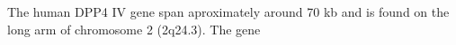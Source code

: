 The human DPP4 IV gene span aproximately around 70 kb and is found on the long arm of chromosome 2 (2q24.3). The gene 